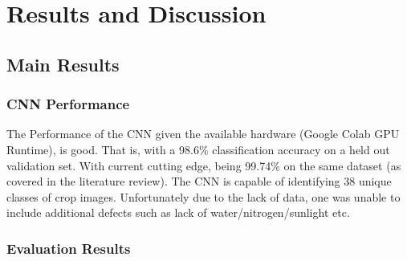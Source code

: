 \chapter{Results and Discussion}
\label{results_discussion}
\section{Main Results}
  \subsection{CNN Performance}
    The Performance of the CNN given the available hardware (Google Colab GPU Runtime), is good. That is, with a 98.6\% classification accuracy on a held out validation set. With current cutting edge, being 99.74\% on the same dataset (as covered in the literature review). The CNN is capable of identifying 38 unique classes of crop images. Unfortunately due to the lack of data, one was unable to include additional defects such as lack of water/nitrogen/sunlight etc.

    \subsection{Evaluation Results}
